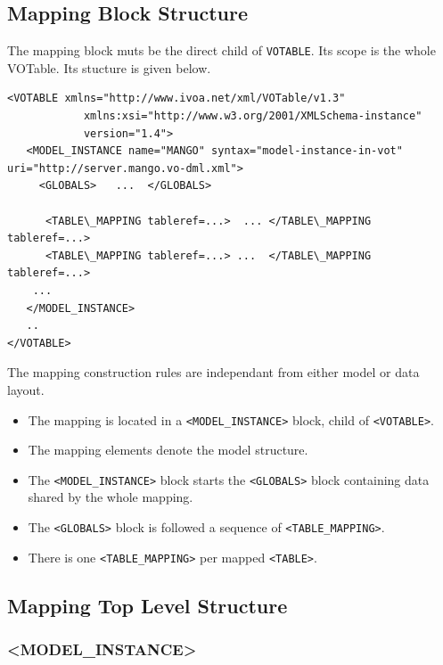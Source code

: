 \documentclass[11pt,a4paper]{ivoa}
\begin{document}
\subsection{Mapping Block Structure}

The mapping block muts be the direct child of \texttt{VOTABLE}. Its scope is the whole VOTable. Its stucture is given below.

\begin{lstlisting}[caption={Complete mapping block example},style=XML]
<VOTABLE xmlns="http://www.ivoa.net/xml/VOTable/v1.3" 
            xmlns:xsi="http://www.w3.org/2001/XMLSchema-instance" 
            version="1.4">
   <MODEL_INSTANCE name="MANGO" syntax="model-instance-in-vot"  uri="http://server.mango.vo-dml.xml">
     <GLOBALS>   ...  </GLOBALS>

      <TABLE\_MAPPING tableref=...>  ... </TABLE\_MAPPING tableref=...>
      <TABLE\_MAPPING tableref=...> ...  </TABLE\_MAPPING tableref=...>
    ...
   </MODEL_INSTANCE>
   ..
</VOTABLE>
\end{lstlisting}

The mapping construction rules are independant from either model or data layout.

\begin{itemize}
    \item The mapping is located in a \texttt{<MODEL\_INSTANCE>} block, child of \texttt{<VOTABLE>}.
    \item The mapping elements denote the model structure.
    \item The \texttt{<MODEL\_INSTANCE>} block starts the \texttt{<GLOBALS>} block containing data shared by the whole mapping.    
    \item The \texttt{<GLOBALS>} block is followed a sequence of \texttt{<TABLE\_MAPPING>}.
    \item There is one \texttt{<TABLE\_MAPPING>} per mapped \texttt{<TABLE>}.
\end{itemize}
\FloatBarrier

%
%

\subsection{Mapping Top Level Structure}
%
%

\subsubsection{<MODEL\_INSTANCE>}
\end{document}
